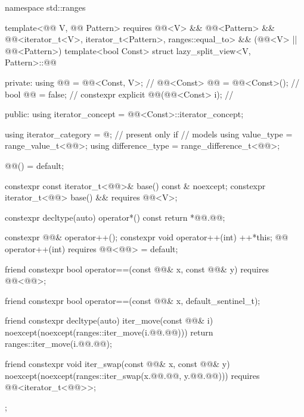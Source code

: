 %
\begin{codeblock}
namespace std::ranges {
  template<@@ V, @@ Pattern>
    requires @@<V> && @@<Pattern> &&
             @@<iterator_t<V>, iterator_t<Pattern>, ranges::equal_to> &&
             (@@<V> || @@<Pattern>)
  template<bool Const>
  struct lazy_split_view<V, Pattern>::@@ {
  private:
    using @@ = @@<Const, V>;                             // \expos
    @@<Const> @@ = @@<Const>();             // \expos
    bool @@ = false;                                      // \expos
    constexpr explicit @@(@@<Const> i);     // \expos

  public:
    using iterator_concept  = @@<Const>::iterator_concept;

    using iterator_category = @\seebelownc@;                    // present only if 
                                                            // models 
    using value_type        = range_value_t<@@>;
    using difference_type   = range_difference_t<@@>;

    @@() = default;

    constexpr const iterator_t<@@>& base() const & noexcept;
    constexpr iterator_t<@@> base() && requires @@<V>;

    constexpr decltype(auto) operator*() const { return *@@.@@; }

    constexpr @@& operator++();
    constexpr void operator++(int) {
      ++*this;
    }
    @@ operator++(int) requires @@<@@> = default;

    friend constexpr bool operator==(const @@& x, const @@& y)
      requires @@<@@>;

    friend constexpr bool operator==(const @@& x, default_sentinel_t);

    friend constexpr decltype(auto) iter_move(const @@& i)
    noexcept(noexcept(ranges::iter_move(i.@@.@@))) {
      return ranges::iter_move(i.@@.@@);
    }

    friend constexpr void iter_swap(const @@& x, const @@& y)
      noexcept(noexcept(ranges::iter_swap(x.@@.@@, y.@@.@@)))
      requires @@<iterator_t<@@>>;
  };
}
\end{codeblock}

